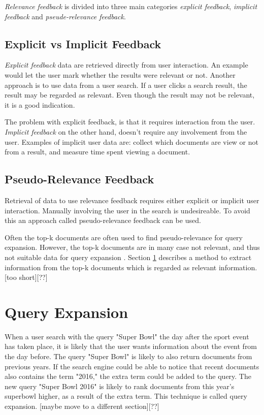 \textit{Relevance feedback} is divided into three main categories \textit{explicit feedback}, \textit{implicit feedback} and \textit{pseude-relevance feedback}.

\subsection{Explicit vs Implicit Feedback}
\textit{Explicit feedback} data are retrieved directly from user interaction.
An example would let the user mark whether the results were relevant or not.
Another approach is to use data from a user search.
If a user clicks a search result, the result may be regarded as relevant.
Even though the result may not be relevant, it is a good indication.

The problem with explicit feedback, is that it requires interaction from the user.
\textit{Implicit feedback} on the other hand, doesn't require any involvement from the user.
Examples of implicit user data are:
collect which documents are view or not from a result, and measure time spent viewing a document.

\subsection{Pseudo-Relevance Feedback}
Retrieval of data to use relevance feedback requires either explicit or implicit user interaction.
Manually involving the user in the search is undesireable.
To avoid this an approach called pseudo-relevance feedback can be used.

Often the top-k documents are often used to find pseudo-relevance for query expansion.
However, the top-k documents are in many case not relevant, and thus not suitable data for query expansion \cite{pseudo-relevance-invalid}.
Section \ref{sec:query-expansion} describes a method to extract information from the top-k documents which is regarded as relevant information.
[too short][??]

\section{Query Expansion}
\label{sec:query-expansion}
When a user search with the query "Super Bowl" the day after the sport event has taken place,
it is likely that the user wants information about the event from the day before.
The query "Super Bowl" is likely to also return documents from previous years.
If the search engine could be able to notice that recent documents also contains the term "2016,"
the extra term could be added to the query.
The new query "Super Bowl 2016" is likely to rank documents from this year's superbowl higher, as a result of the extra term.
This technique is called query expansion. [maybe move to a different section][??]

